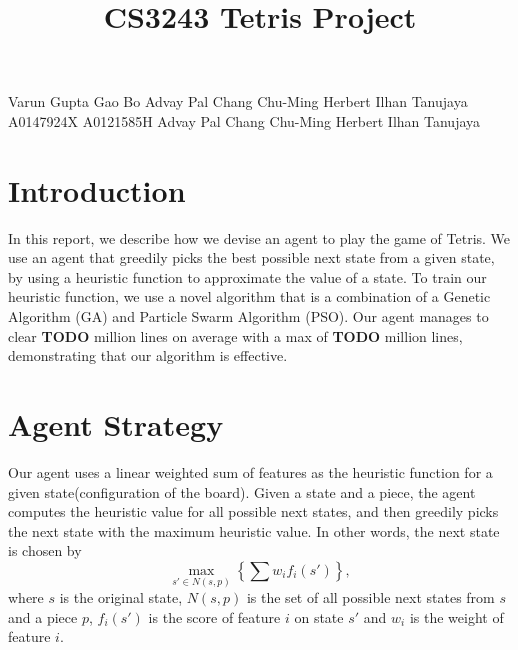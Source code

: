 \documentclass[12pt]{article}
\title{CS3243 Tetris Project}
\author{}
\date{}
\begin{document}
	\vspace{-4cm}
	\maketitle
	\thispagestyle{empty}
	\vspace{-3cm}

	{\small Varun Gupta \;\;\;\;  Gao Bo \;\;\;\; Advay Pal \;\;\;\; Chang Chu-Ming \;\;\;\; Herbert Ilhan Tanujaya}\\
	{\small A0147924X \;\;\;\;  A0121585H \;\;\;\; Advay Pal \;\;\;\; Chang Chu-Ming \;\;\;\; Herbert Ilhan Tanujaya}

    \section{Introduction}
	\vspace{-0.3cm}
    In this report, we describe how we devise an agent to play the game of Tetris.
    We use an agent that greedily picks the best possible next state from a given state,
    by using a heuristic function to approximate the value of a state. To train our heuristic
    function, we use a novel algorithm that is a combination of a Genetic Algorithm (GA)
    and Particle Swarm Algorithm (PSO). Our agent manages to clear \textbf{TODO} million lines on average with a max
    of \textbf{TODO} million lines, demonstrating that our algorithm is effective.

	\vspace{-0.3cm}
    \section{Agent Strategy}
	\vspace{-0.3cm}
	Our agent uses a linear weighted sum of features as the heuristic function for
	a given state(configuration of the board). Given a
	state and a piece, the agent computes the heuristic value for all possible next
	states, and then greedily picks the next state with the maximum heuristic
	value. In other words, the next state is chosen by \small \[ \max_{s' \in N(s, p)}
	\left\{ \sum w_i f_i(s') \right\}, \] \normalsize where $s$ is the original state, $N(s,
	p)$ is the set of all possible next states from $s$ and a piece $p$, $f_i(s')$
	is the score of feature $i$ on state $s'$ and $w_i$ is the weight of feature
	$i$.

	\vspace{-0.3cm}
\end{document}
